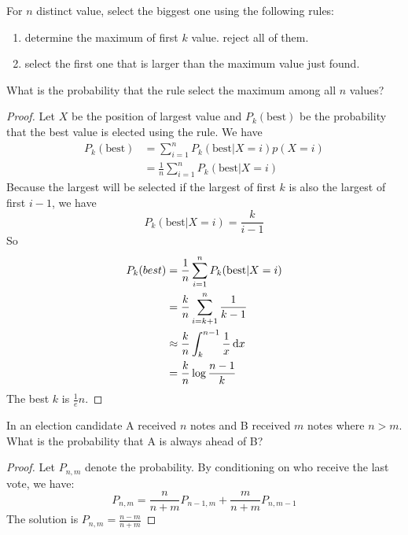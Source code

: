 \begin{example}
    For $n$ distinct value, select the biggest one using the following rules:
    \begin{enumerate}
        \item determine the maximum of first $k$ value. reject all of them.
        \item select the first one that is larger than the maximum value just found.
    \end{enumerate}
    What is the probability that the rule select the maximum among all $n$ values?
\end{example}
\begin{proof}
    Let $X$ be the position of largest value and $P_k(\text{best})$ be the probability that the best value is elected using the rule. We have
    \begin{equation*}
        \begin{aligned}
            P_k (\text{best}) &= \sum_{i=1}^n P_k (\text{best} | X = i) p(X=i) \\
            &= \frac{1}{n} \sum_{i=1}^n P_k (\text{best}|X=i)
        \end{aligned}
    \end{equation*}
    Because the largest will be selected if the largest of first $k$ is also the largest of first $i-1$, we have
    \begin{equation*}
        P_k(\text{best} | X=i) = \frac{k}{i-1}
    \end{equation*}
    So
    \begin{equation*}
        \begin{aligned}
            P_k(best) &= \frac{1}{n} \sum_{i=1}^n P_k (\text{best}|X=i) \\
            &= \frac{k}{n} \sum_{i=k+1}^n \frac{1}{k-1} \\
            &\approx \frac{k}{n} \int_k^{n-1} \frac{1}{x} \dif{x} \\
            &= \frac{k}{n} \log{\frac{n-1}{k}}
        \end{aligned}
    \end{equation*}
    The best $k$ is $\displaystyle \frac{1}{e} n$.
\end{proof}

\begin{example}
    In an election candidate A received $n$ notes and B received $m$ notes where $n > m$. What is the probability that A is always ahead of B?
\end{example}
\begin{proof}
    Let $P_{n,m}$ denote the probability. By conditioning on who receive the last vote, we have:
    \begin{equation*}
        P_{n,m} = \frac{n}{n+m} P_{n-1,m} + \frac{m}{n+m}P_{n,m-1}
    \end{equation*}    
    The solution is $\displaystyle P_{n,m} = \frac{n-m}{n+m}$
\end{proof}


